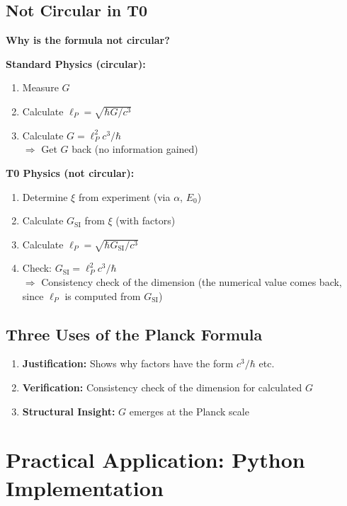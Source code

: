 	\subsection{Not Circular in T0}
	
	\textbf{Why is the formula not circular?}
	
	\textbf{Standard Physics (circular):}
	\begin{enumerate}
		\item Measure $G$
		\item Calculate $\ell_P = \sqrt{\hbar G / c^3}$
		\item Calculate $G = \ell_P^2 c^3 / \hbar$ \\
		$\Rightarrow$ Get $G$ back (no information gained)
	\end{enumerate}
	
	\textbf{T0 Physics (not circular):}
	\begin{enumerate}
		\item Determine $\xi$ from experiment (via $\alpha$, $E_0$)
		\item Calculate $G_{\text{SI}}$ from $\xi$ (with factors)
		\item Calculate $\ell_P = \sqrt{\hbar G_{\text{SI}} / c^3}$
		\item Check: $G_{\text{SI}} = \ell_P^2 c^3 / \hbar$ \\
		$\Rightarrow$ Consistency check of the dimension (the numerical value comes back, since $\ell_P$ is computed from $G_{\text{SI}}$)
	\end{enumerate}
	
	\subsection{Three Uses of the Planck Formula}
	
	\begin{enumerate}
		\item \textbf{Justification:} Shows why factors have the form $c^3/\hbar$ etc.
		
		\item \textbf{Verification:} Consistency check of the dimension for calculated $G$
		
		\item \textbf{Structural Insight:} $G$ emerges at the Planck scale
	\end{enumerate}
	
	\section{Practical Application: Python Implementation}
	
